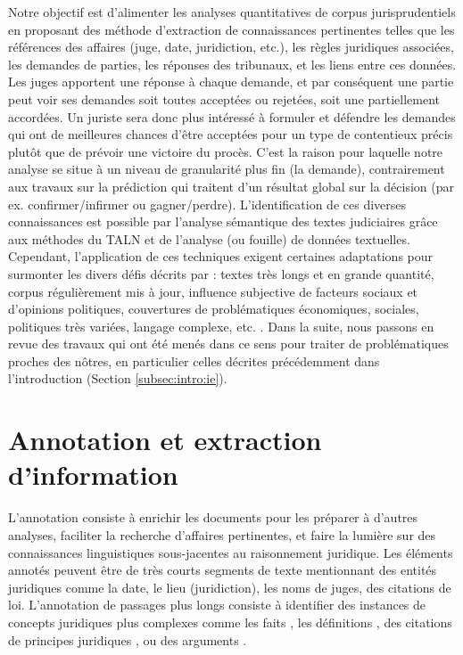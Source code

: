 Notre objectif est d'alimenter les analyses quantitatives de corpus jurisprudentiels en proposant des méthode d'extraction de connaissances pertinentes telles que les références des affaires (juge, date, juridiction, etc.), les règles juridiques associées, les demandes de parties, les réponses des tribunaux, et les liens entre ces données. Les juges apportent une réponse à chaque demande, et par conséquent une partie peut voir ses demandes soit toutes acceptées ou rejetées, soit une partiellement accordées. Un juriste sera donc plus intéressé à formuler et défendre les demandes qui ont de meilleures chances d'être acceptées pour un type de contentieux précis plutôt que de prévoir une victoire du procès. C'est la raison pour laquelle notre analyse se situe à un niveau de granularité plus fin (la demande), contrairement aux travaux sur la prédiction qui traitent d'un résultat global sur la décision (par ex. confirmer/infirmer ou gagner/perdre).  L'identification de ces diverses connaissances est possible par l'analyse sémantique des textes judiciaires grâce aux méthodes du TALN et de l'analyse (ou fouille) de données textuelles. Cependant, l'application de ces techniques exigent certaines adaptations pour surmonter les divers défis décrits par \citet{narazenko2017legalnlpintro}: textes très longs et en grande quantité, corpus régulièrement mis à jour, influence subjective de facteurs sociaux et d'opinions politiques, couvertures de problématiques économiques, sociales, politiques très variées, langage complexe, etc. . Dans la suite, nous passons en revue des travaux qui ont été menés dans ce sens pour traiter de problématiques proches des nôtres, en particulier celles décrites précédemment dans l'introduction (Section \ref{subsec:intro:ie}). 

\section{Annotation et extraction d'information}

L'annotation consiste à enrichir les documents pour les préparer à d'autres analyses, faciliter la recherche d'affaires pertinentes, et faire la lumière sur des connaissances linguistiques sous-jacentes au raisonnement juridique. Les éléments annotés peuvent être de très courts segments de texte mentionnant des entités juridiques \citep{Waltl2016lexia, wyner2010extractlegalelts} comme la date, le lieu (juridiction), les noms de juges, des citations de loi.  L'annotation de passages plus longs consiste à identifier des instances de concepts juridiques plus complexes comme les faits \citep{wyner2010extractlegalelts, wyner2010casefactors, Shulayeva2017recognfactprincip}, les définitions \citep{Waltl2016lexia,waltl2017legaliegerman}, des citations de principes juridiques \citep{Shulayeva2017recognfactprincip}, ou des arguments \citep{WynerMoens2010mineargument}. 

